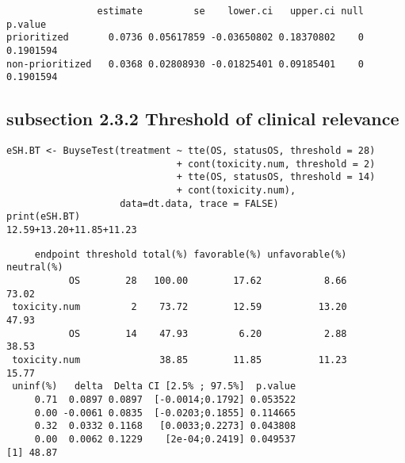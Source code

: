 \documentclass[12pt]{article}
\begin{document}
\begin{verbatim}
                estimate         se    lower.ci   upper.ci null   p.value
prioritized       0.0736 0.05617859 -0.03650802 0.18370802    0 0.1901594
non-prioritized   0.0368 0.02808930 -0.01825401 0.09185401    0 0.1901594
\end{verbatim}

\subsection{subsection 2.3.2 Threshold of clinical relevance}
\label{sec:org8584531}
\lstset{language=r,label= ,caption= ,captionpos=b,numbers=none}
\begin{lstlisting}
eSH.BT <- BuyseTest(treatment ~ tte(OS, statusOS, threshold = 28)
                              + cont(toxicity.num, threshold = 2)
                              + tte(OS, statusOS, threshold = 14)
                              + cont(toxicity.num),
                    data=dt.data, trace = FALSE)
print(eSH.BT)
12.59+13.20+11.85+11.23
\end{lstlisting}

\begin{verbatim}
     endpoint threshold total(%) favorable(%) unfavorable(%) neutral(%)
           OS        28   100.00        17.62           8.66      73.02
 toxicity.num         2    73.72        12.59          13.20      47.93
           OS        14    47.93         6.20           2.88      38.53
 toxicity.num              38.85        11.85          11.23      15.77
 uninf(%)   delta  Delta CI [2.5% ; 97.5%]  p.value
     0.71  0.0897 0.0897  [-0.0014;0.1792] 0.053522
     0.00 -0.0061 0.0835  [-0.0203;0.1855] 0.114665
     0.32  0.0332 0.1168   [0.0033;0.2273] 0.043808
     0.00  0.0062 0.1229    [2e-04;0.2419] 0.049537
[1] 48.87
\end{verbatim}
\end{document}
